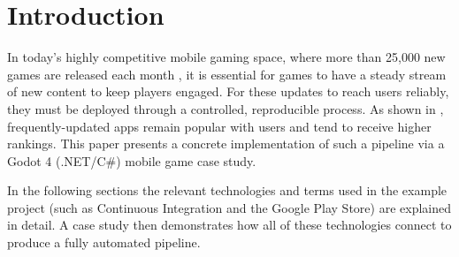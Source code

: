 \section{Introduction}
In today's highly competitive mobile gaming space, where more than 25,000 new games are released each month \cite{b15}, it is essential for games to have a steady stream of new content to keep players engaged. For these updates to reach users reliably, they must be deployed through a controlled, reproducible process. As shown in \cite{b14}, frequently-updated apps remain popular with users and tend to receive higher rankings. This paper presents a concrete implementation of such a pipeline via a Godot 4 (.NET/C\#) mobile game case study.

In the following sections the relevant technologies and terms used in the example project (such as Continuous Integration and the Google Play Store) are explained in detail. A case study then demonstrates how all of these technologies connect to produce a fully automated pipeline.